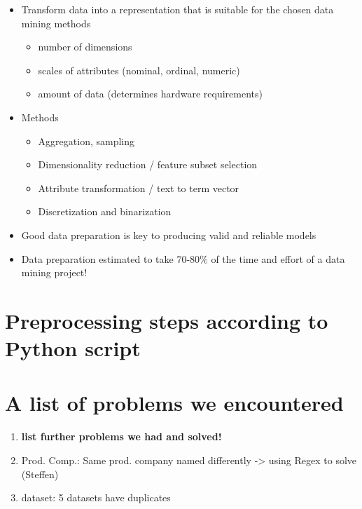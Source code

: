 \begin{itemize}
	\item Transform data into a representation that is suitable for the chosen data mining methods
	\begin{itemize}
		\item number of dimensions
		\item scales of attributes (nominal, ordinal, numeric)
		\item amount of data (determines hardware requirements)
	\end{itemize}
	\item Methods
	\begin{itemize}
		\item Aggregation, sampling
		\item Dimensionality reduction / feature subset selection
		\item Attribute transformation / text to term vector
		\item Discretization and binarization
	\end{itemize}
	\item Good data preparation is key to producing valid and reliable models
	\item Data preparation estimated to take 70-80\% of the time and effort of a data mining project!
\end{itemize}


\section{Preprocessing steps according to Python script}

\section{A list of problems we encountered}
\begin{enumerate}
	\item \textbf{list further problems we had and solved!}
	\item Prod. Comp.: Same prod. company named differently -> using Regex to solve (Steffen)
	\item dataset: 5 datasets have duplicates
\end{enumerate}
